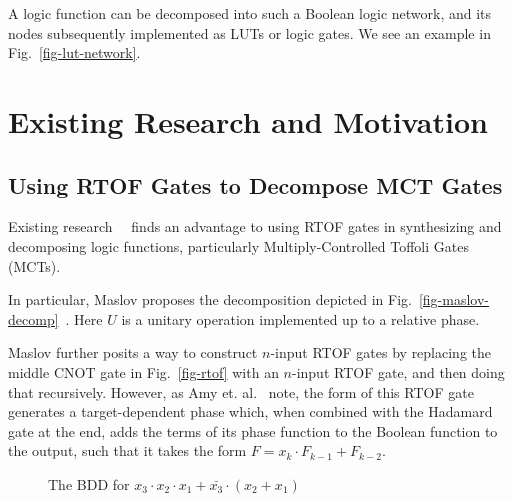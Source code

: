 A logic function can be decomposed into such a Boolean logic network, and its nodes subsequently implemented as LUTs or logic gates. We see an example in Fig.~\ref{fig-lut-network}.

\section{Existing Research and Motivation}
 \label{Sec:Exist}

\subsection{Using RTOF Gates to Decompose MCT Gates}
Existing research~\cite{bib-rtof-maslov}~\cite{bib-selinger-rtof} finds an advantage to using RTOF gates in synthesizing and decomposing logic functions, particularly Multiply-Controlled Toffoli Gates (MCTs).

In particular, Maslov proposes the decomposition depicted in Fig.~\ref{fig-maslov-decomp}~\cite{bib-rtof-maslov}. Here $U$ is a unitary operation implemented up to a relative phase.

Maslov further posits a way to construct $n$-input RTOF gates by replacing the middle CNOT gate in Fig.~\ref{fig-rtof} with an $n$-input RTOF gate, and then doing that recursively. However, as Amy et. al.~\cite{bib-amy-phase-state} note, the form of this RTOF gate generates a target-dependent phase which, when combined with the Hadamard gate at the end, adds the terms of its phase function to the Boolean function to the output, such that it takes the form $F = x_k \cdot F_{k-1} + F_{k-2}$.
\begin{figure}[tbp]
  \begin{minipage}{0.50\linewidth}
    \begin{center}
      \scalebox{1.0} {
        
      }
      \caption{The Quantum Circuit implementing Fig.~\ref{fig-lut-network} }
      \label{fig-lut-qc}
    \end{center}
  \end{minipage}
  \hspace{0.08\linewidth}
  \begin{minipage}{0.40\linewidth}
    \begin{center}
      
      \caption{The BDD for $x_3 \cdot x_2 \cdot x_1 + \bar{x_3} \cdot (x_2 + x_1)$}
      \label{fig-func-bdd}
    \end{center}
  \end{minipage}
\end{figure}

